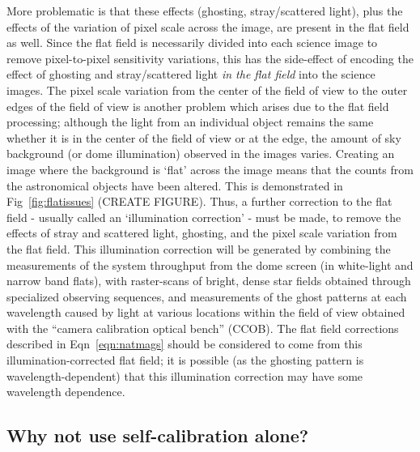 \documentclass[12pt,preprint]{aastex}
\begin{document}
More problematic is that these effects (ghosting, stray/scattered
light), plus the effects of the variation of pixel scale across the
image, are present in the flat field as well. Since the flat field is
necessarily divided into each science image to remove pixel-to-pixel
sensitivity variations, this has the side-effect of encoding the
effect of ghosting and stray/scattered light {\it in the flat field}
into the science images. The pixel scale variation from the center of
the field of view to the outer edges of the field of view is another
problem which arises due to the flat field processing; although the
light from an individual object remains the same whether it is in the
center of the field of view or at the edge, the amount of sky
background (or dome illumination) observed in the images varies.
Creating an image where the background is `flat' across the image
means that the counts from the astronomical objects have been altered.
This is demonstrated in Fig~\ref{fig:flatissues} (CREATE
FIGURE). Thus, a further correction to the flat field - usually called
an `illumination correction' - must be made, to remove the effects of
stray and scattered light, ghosting, and the pixel scale variation
from the flat field. This illumination correction will be generated by
combining the measurements of the system throughput from the dome
screen (in white-light and narrow band flats), with raster-scans of
bright, dense star fields obtained through specialized observing
sequences, and measurements of the ghost patterns at each wavelength
caused by light at various locations within the field of view obtained
with the ``camera calibration optical bench'' (CCOB).  The flat field
corrections described in Eqn~\ref{eqn:natmags} should be considered to
come from this illumination-corrected flat field; it is possible (as
the ghosting pattern is wavelength-dependent) that this illumination
correction may have some wavelength dependence. 
 
\subsection{Why not use self-calibration alone?}
\end{document}

